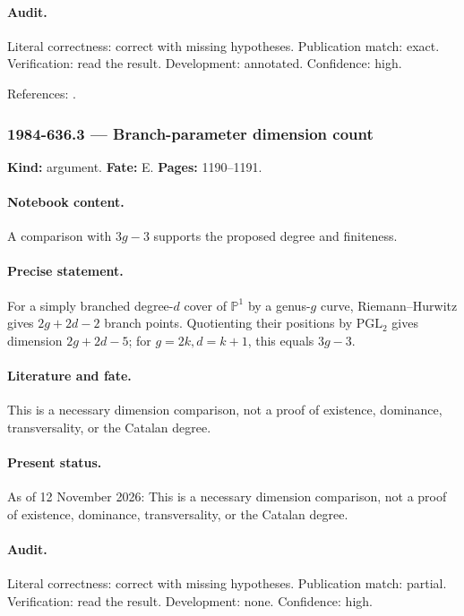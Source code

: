 \paragraph{Audit.} Literal correctness: correct with missing hypotheses. Publication match: exact. Verification: read the result. Development: annotated. Confidence: high.

\noindent References: \citep{griffithsharris1980special}.\par

\subsubsection{1984-636.3 --- Branch-parameter dimension count}

\label{item:1984-636.3}

\noindent\textbf{Kind:} argument. \textbf{Fate:} E. \textbf{Pages:} 1190--1191.\par

\paragraph{Notebook content.} A comparison with \(3g-3\) supports the proposed degree and finiteness.

\paragraph{Precise statement.} For a simply branched degree-\(d\) cover of \(\mathbb P^1\) by a genus-\(g\) curve, Riemann--Hurwitz gives \(2g+2d-2\) branch points. Quotienting their positions by \(\mathrm{PGL}_2\) gives dimension \(2g+2d-5\); for \(g=2k,d=k+1\), this equals \(3g-3\).

\paragraph{Literature and fate.} This is a necessary dimension comparison, not a proof of existence, dominance, transversality, or the Catalan degree.

\paragraph{Present status.} As of 12 November 2026: This is a necessary dimension comparison, not a proof of existence, dominance, transversality, or the Catalan degree.

\paragraph{Audit.} Literal correctness: correct with missing hypotheses. Publication match: partial. Verification: read the result. Development: none. Confidence: high.

